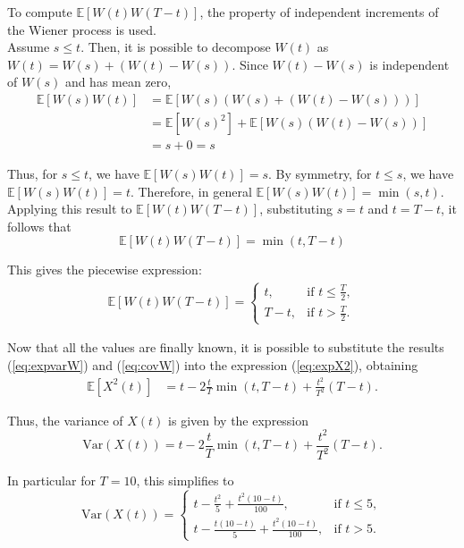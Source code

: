 To compute $\mathbb{E}[W(t)W(T-t)]$, the property of independent increments of the Wiener process is used. \\

Assume $s \leq t$. Then, it is possible to decompose $W(t)$ as $W(t) = W(s) + (W(t) - W(s))$.
Since $W(t) - W(s)$ is independent of $W(s)$ and has mean zero,
\begin{align*}
\mathbb{E}[W(s)W(t)] &= \mathbb{E}[W(s)(W(s) + (W(t) - W(s)))] \\
&= \mathbb{E}[W(s)^2] + \mathbb{E}[W(s)(W(t) - W(s))] \\
&= s + 0 = s
\end{align*}

Thus, for $s \leq t$, we have $\mathbb{E}[W(s)W(t)] = s$. By symmetry, for $t \leq s$, we have $\mathbb{E}[W(s)W(t)] = t$. Therefore, in general $\mathbb{E}[W(s)W(t)] = \min(s, t).$
Applying this result to $\mathbb{E}[W(t)W(T-t)]$, substituting $s = t$ and $t = T - t$, it follows that
\begin{equation*}
    \mathbb{E}[W(t)W(T-t)] = \min(t, T - t)
\end{equation*}

This gives the piecewise expression:
\begin{align}
\mathbb{E}[W(t)W(T-t)] = 
\begin{cases}
t, & \text{if } t \leq \frac{T}{2}, \\
T - t, & \text{if } t > \frac{T}{2}. \label{eq:covW}
\end{cases}
\end{align}

Now that all the values are finally known, it is possible to substitute the results (\ref{eq:expvarW}) and (\ref{eq:covW}) into the expression (\ref{eq:expX2}), obtaining
\begin{align*}
\mathbb{E}[X^2(t)] &= t - 2\frac{t}{T}\min(t, T-t) + \frac{t^2}{T^2}(T-t).
\end{align*}

Thus, the variance of $X(t)$ is given by the expression
\begin{equation*}
\text{Var}(X(t)) = t - 2\frac{t}{T}\min(t, T-t) + \frac{t^2}{T^2}(T-t).
\end{equation*}

In particular for $T = 10$, this simplifies to
\begin{equation}
\text{Var}(X(t)) = 
\begin{cases}
t - \frac{t^2}{5} + \frac{t^2(10-t)}{100}, & \text{if } t \leq 5, \\
t - \frac{t(10-t)}{5} + \frac{t^2(10-t)}{100}, & \text{if } t > 5. \label{eq:var_t}
\end{cases}
\end{equation}

